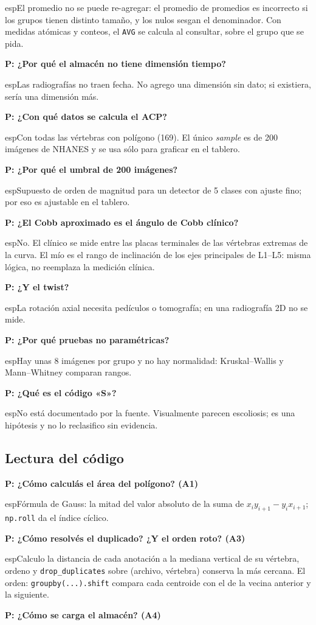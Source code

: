 \documentclass[11pt,a4paper]{article}
\newcommand{\preg}[1]{\par\medskip\textbf{P: #1}\par\nopagebreak}
\begin{document}
esp{El promedio no se puede re-agregar: el promedio de promedios es incorrecto si los grupos tienen distinto tamaño, y los nulos sesgan el denominador. Con medidas atómicas y conteos, el \texttt{AVG} se calcula al consultar, sobre el grupo que se pida.}
\preg{¿Por qué el almacén no tiene dimensión tiempo?}

esp{Las radiografías no traen fecha. No agrego una dimensión sin dato; si existiera, sería una dimensión más.}
\preg{¿Con qué datos se calcula el ACP?}

esp{Con todas las vértebras con polígono (169). El único \emph{sample} es de 200 imágenes de NHANES y se usa sólo para graficar en el tablero.}
\preg{¿Por qué el umbral de 200 imágenes?}

esp{Supuesto de orden de magnitud para un detector de 5 clases con ajuste fino; por eso es ajustable en el tablero.}
\preg{¿El Cobb aproximado es el ángulo de Cobb clínico?}

esp{No. El clínico se mide entre las placas terminales de las vértebras extremas de la curva. El mío es el rango de inclinación de los ejes principales de L1--L5: misma lógica, no reemplaza la medición clínica.}
\preg{¿Y el twist?}

esp{La rotación axial necesita pedículos o tomografía; en una radiografía 2D no se mide.}
\preg{¿Por qué pruebas no paramétricas?}

esp{Hay unas 8 imágenes por grupo y no hay normalidad: Kruskal--Wallis y Mann--Whitney comparan rangos.}
\preg{¿Qué es el código «S»?}

esp{No está documentado por la fuente. Visualmente parecen escoliosis; es una hipótesis y no lo reclasifico sin evidencia.}

\subsection*{Lectura del código}
\preg{¿Cómo calculás el área del polígono? (A1)}

esp{Fórmula de Gauss: la mitad del valor absoluto de la suma de $x_iy_{i+1}-y_ix_{i+1}$; \texttt{np.roll} da el índice cíclico.}
\preg{¿Cómo resolvés el duplicado? ¿Y el orden roto? (A3)}

esp{Calculo la distancia de cada anotación a la mediana vertical de su vértebra, ordeno y \texttt{drop\_duplicates} sobre (archivo, vértebra) conserva la más cercana. El orden: \texttt{groupby(...).shift} compara cada centroide con el de la vecina anterior y la siguiente.}
\preg{¿Cómo se carga el almacén? (A4)}
\end{document}
